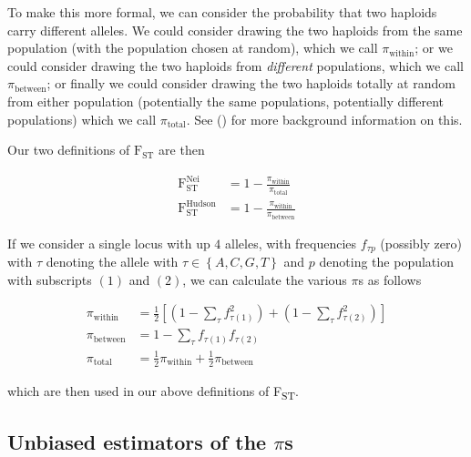 \documentclass[a4paper,9pt,DIV=14]{scrartcl}
\newcommand{\fst}{F\textsubscript{ST}}
\newcommand\citeay[1]{\citeauthor{#1} (\citeyear{#1}) \cite{#1}}
\begin{document}
To make this more formal, we can consider the probability that two haploids carry different alleles.
We could consider drawing the two haploids from the same population (with the population chosen at random), which we call $\pi_\text{within}$; or we could consider drawing the two haploids from \emph{different} populations, which we call $\pi_\text{between}$; or finally we could consider drawing the two haploids totally at random from either population (potentially the same populations, potentially different populations) which we call $\pi_\text{total}$.
See \citeay{Bhatia2013} for more background information on this.

Our two definitions of $\text{F}_\text{ST}$ are then

\begin{align}
    \text{F}_\text{ST}^\text{Nei}    &= 1 - \frac{\pi_\text{within}}{\pi_\text{total}} \\
    \text{F}_\text{ST}^\text{Hudson} &= 1 - \frac{\pi_\text{within}}{\pi_\text{between}}
\end{align}

If we consider a single locus with up $4$ alleles, with frequencies $f_{\tau{}p}$ (possibly zero) with  $\tau$ denoting the allele with $\tau \in \left\{A, C, G, T\right\}$ and $p$ denoting the population with subscripts $(1)$ and $(2)$, we can calculate the various $\pi$s as follows

\begin{align}
    \label{eq:PiDefs:PiWithin}
    \pi_\text{within} &= \frac{1}{2}\left[\left(1 - \sum_\tau f_{\tau(1)}^2\right) + \left(1 - \sum_\tau f_{\tau(2)}^2\right)\right] \\
    \label{eq:PiDefs:PiBetween}
    \pi_\text{between} &= 1 - \sum_\tau f_{\tau(1)}f_{\tau(2)} \\
    \label{eq:PiDefs:PiTotal}
    \pi_\text{total} &= \frac{1}{2}\pi_\text{within} + \frac{1}{2}\pi_\text{between}
\end{align}

which are then used in our above definitions of \fst.


\subsection{Unbiased estimators of the \texorpdfstring{$\pi$s}{pi's}}
\label{supp:sec:FST:sub:EstimatorsPi}
\end{document}
